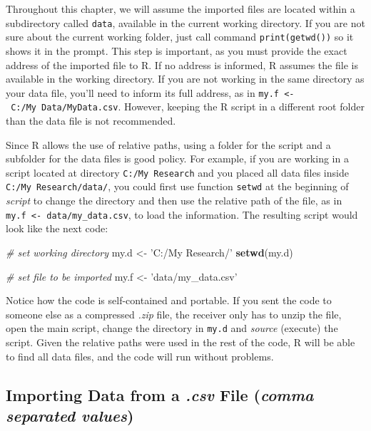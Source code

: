 \documentclass[11pt,]{book}
\newenvironment{Shaded}{\begin{snugshade}}{\end{snugshade}}
\newcommand{\KeywordTok}[1]{\textcolor[rgb]{0.27,0.27,0.27}{\textbf{#1}}}
\newcommand{\StringTok}[1]{\textcolor[rgb]{0.5,0.5,0.5}{#1}}
\newcommand{\CommentTok}[1]{\textcolor[rgb]{0.56,0.35,0.01}{\textit{#1}}}
\newcommand{\NormalTok}[1]{#1}
\begin{document}
Throughout this chapter, we will assume the imported files are located
within a subdirectory called \texttt{data}, available in the current
working directory. If you are not sure about the current working folder,
just call command \texttt{print(getwd())} so it shows it in the prompt.
This step is important, as you must provide the exact address of the
imported file to R. If no address is informed, R assumes the file is
available in the working directory. If you are not working in the same
directory as your data file, you'll need to inform its full address, as
in
\texttt{my.f\ \textless{}-\ \textquotesingle{}C:/My\ Data/MyData.csv\textquotesingle{}}.
However, keeping the R script in a different root folder than the data
file is not recommended.

Since R allows the use of relative paths, using a folder for the script
and a subfolder for the data files is good policy. For example, if you
are working in a script located at directory \texttt{C:/My\ Research}
and you placed all data files inside \texttt{C:/My\ Research/data/}, you
could first use function \texttt{setwd} at the beginning of
\emph{script} to change the directory and then use the relative path of
the file, as in
\texttt{my.f\ \textless{}-\ \textquotesingle{}data/my\_data.csv\textquotesingle{}},
to load the information. The resulting script would look like the next
code:

\begin{Shaded}
\begin{Highlighting}[]
\CommentTok{# set working directory}
\NormalTok{my.d <-}\StringTok{ 'C:/My Research/'}
\KeywordTok{setwd}\NormalTok{(my.d)}

\CommentTok{# set file to be imported}
\NormalTok{my.f <-}\StringTok{ 'data/my_data.csv'}
\end{Highlighting}
\end{Shaded}

Notice how the code is self-contained and portable. If you sent the code
to someone else as a compressed \emph{.zip} file, the receiver only has
to unzip the file, open the main script, change the directory in
\texttt{my.d} and \emph{source} (execute) the script. Given the relative
paths were used in the rest of the code, R will be able to find all data
files, and the code will run without problems.

\subsection{\texorpdfstring{Importing Data from a \emph{.csv} File
(\emph{comma separated
values})}{Importing Data from a .csv File (comma separated values)}}\label{importing-data-from-a-.csv-file-comma-separated-values}
\end{document}
